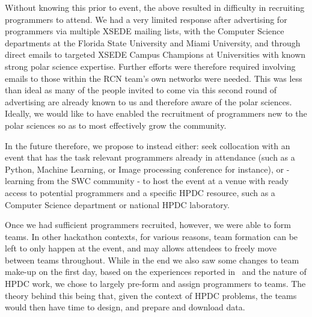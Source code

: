 \documentclass[conference]{IEEEtran}
\begin{document}

Without knowing this prior to event, the above resulted in difficulty in recruiting programmers to attend.  We had a very limited response after advertising for programmers via multiple XSEDE mailing lists, with the Computer Science departments at the Florida State University and Miami University, and through direct emails to targeted XSEDE Campus Champions at Universities with known strong polar science expertise. Further efforts were therefore required involving emails to those within the RCN team's own networks were needed. This was less than ideal as many of the people invited to come via this second round of advertising are already known to us and therefore aware of the polar sciences. Ideally, we would like to have enabled the recruitment of programmers new to the polar sciences so as to most effectively grow the community.  

In the future therefore, we propose to instead either: seek collocation with an event that has the task relevant programmers already in attendance (such as a Python, Machine Learning, or Image processing conference for instance), or - learning from the SWC community - to host the event at a venue with ready access to potential programmers and a specific HPDC resource, such as a Computer Science department or national HPDC laboratory.

Once we had sufficient programmers recruited, however, we were able to form teams. In other hackathon contexts, for various reasons, team formation can be left to only happen at the event, and may allows attendees to freely move between teams throughout. While in the end we also saw some changes to team make-up on the first day, based on the experiences reported in~\cite{mattmann2015} and the nature of HPDC work, we chose to largely pre-form and assign programmers to teams.  The theory behind this being that, given the context of HPDC problems, the teams would then have time to design, and prepare and download data.
\end{document}

